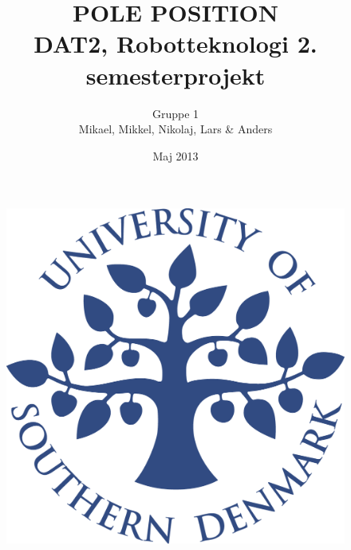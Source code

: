 \title{POLE POSITION \\ DAT2, Robotteknologi 2. semesterprojekt}
\author{Gruppe 1 \\ Mikael, Mikkel, Nikolaj, Lars \& Anders}
\date{Maj 2013}
\begin{figure}
\centering
\includegraphics[width=1\textwidth]{graphics/forside.png}
\end{figure}
\maketitle



